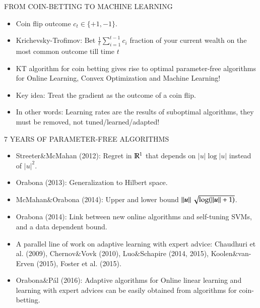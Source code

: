 \documentclass[final,t,serif,mathserif]{beamer}
\def\blockspacea{\vspace{0.cm}}
\begin{document}
\begin{frame}{}
\begin{columns}[t]
\begin{column}{.33\linewidth}
\begin{block}{FROM COIN-BETTING TO MACHINE LEARNING}
    \vspace{1cm}

    \begin{itemize}
      \item Coin flip outcome $c_t \in \{+1, -1\}$.
      \item Krichevsky-Trofimov: Bet $\tfrac{1}{t} \sum_{i=1}^{t-1} c_i$ fraction of your current wealth on the most common outcome till time $t$
      \item \alert{KT algorithm for coin betting gives rise to optimal parameter-free algorithms for Online Learning, Convex Optimization and Machine Learning!}
      \item Key idea: Treat the gradient as the outcome of a coin flip.
      \item In other words: \alert{Learning rates are the results of suboptimal algorithms, they must be removed, not tuned/learned/adapted!}
    \end{itemize}
    
    \blockspacea
    \end{block}

    \begin{block}{7 YEARS OF PARAMETER-FREE ALGORITHMS}
    \blockspacea
    
    \begin{itemize}
    \item Streeter\&McMahan (2012): Regret in $\mathbb{R}^1$ that depends on $|u| \log|u|$ instead of $|u|^2$.
    \item Orabona (2013): Generalization to Hilbert space.
    \item McMahan\&Orabona (2014): Upper and lower bound $\left\|{\boldsymbol{u}}\right\| \sqrt{\log(\left\|{\boldsymbol{u}}\right\|+1)}$.
    \item Orabona (2014): Link between new online algorithms and self-tuning SVMs, and a data dependent bound.
    \item A parallel line of work on adaptive learning with expert advice: Chaudhuri et al. (2009), Chernov\&Vovk (2010), Luo\&Schapire (2014, 2015), Koolen\&van-Erven (2015), Foster et al. (2015).
    \item Orabona\&P\'al (2016): Adaptive algorithms for Online linear learning and learning with expert advices can be easily obtained from algorithms for coin-betting.
    \end{itemize}


\end{block}
\end{column}
\end{columns}
\end{frame}
\end{document}
